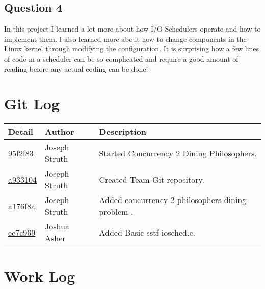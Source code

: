 \documentclass[10pt,draftclsnofoot,onecolumn, compsoc]{IEEEtran}
\begin{document}
\subsection{Question 4}
In this project I learned a lot more about how I/O Schedulers operate and how to implement them. I also learned more about how to change components in the Linux kernel through modifying the configuration. It is surprising how a few lines of code in a scheduler can be so complicated and require a good amount of reading before any actual coding can be done! 

\section{Git Log}

\begin{tabular}{| l | l | p{15cm} |}\textbf{Detail} & \textbf{Author} & \textbf{Description}\\\hline
\href{https://github.com/struthj/CS444/commit/95f2f83c730dfb35f0292b3a825747fdde110c49}{95f2f83} & Joseph Struth & Started Concurrency 2 Dining Philosophers.\\\hline
\href{https://github.com/struthj/CS444-1303/commit/a933104c6c986f873737877b29bcf222933f805d}{a933104} & Joseph Struth & Created Team Git repository.\\\hline
\href{https://github.com/struthj/CS444-1303/commit/a176f8a30f2adef093bb56e16eb97c264fc956ec}{a176f8a} & Joseph Struth & Added concurrency 2 philosophers dining problem .\\\hline
\href{https://github.com/struthj/CS444-1303/commit/ec7c9692fc67d925772e42ce9317378f85fdb296}{ec7c969} & Joshua Asher & Added Basic sstf-iosched.c.\\\hline
\end{tabular}

\section{Work Log}
\end{document}
